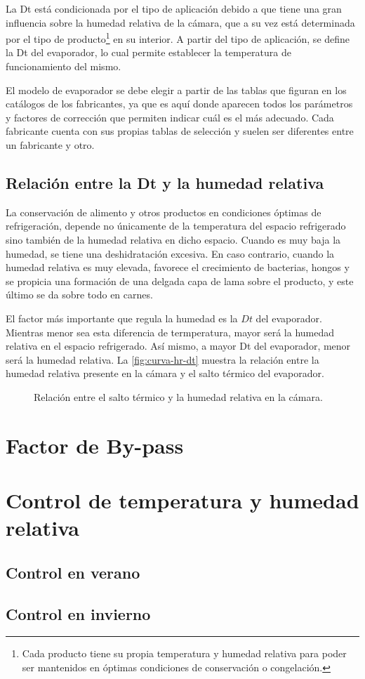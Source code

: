 		La Dt está condicionada por el tipo de aplicación debido a que tiene una gran influencia sobre la humedad relativa de la cámara, que a su vez está determinada por el tipo de producto\footnote{Cada producto tiene su propia temperatura y humedad relativa para poder ser mantenidos en óptimas condiciones de conservación o congelación.} en su interior. A partir del tipo de aplicación, se define la Dt del evaporador, lo cual permite establecer la temperatura de funcionamiento del mismo.
		
		El modelo de evaporador se debe elegir a partir de las tablas que figuran en los catálogos de los fabricantes, ya que es aquí donde aparecen todos los parámetros y factores de corrección que permiten indicar cuál es el más adecuado. Cada fabricante cuenta con sus propias tablas de selección y suelen ser diferentes entre un fabricante y otro.
		
		\subsection{Relación entre la Dt y la humedad relativa}
		
		La conservación de alimento y otros productos en condiciones óptimas de refrigeración, depende no únicamente de la temperatura del espacio refrigerado sino también de la humedad relativa en dicho espacio. Cuando es muy baja la humedad, se tiene una deshidratación excesiva. En caso contrario, cuando la humedad relativa es muy elevada, favorece el crecimiento de bacterias, hongos y se propicia una formación de una delgada capa de lama sobre el producto, y este último se da sobre todo en carnes.
		
		El factor más importante que regula la humedad es la $Dt$ del evaporador. Mientras menor sea esta diferencia de termperatura, mayor será la humedad relativa en el espacio refrigerado. Así mismo, a mayor Dt del evaporador, menor será la humedad relativa. La \autoref{fig:curva-hr-dt} muestra la relación entre la humedad relativa presente en la cámara y el salto térmico del evaporador.
		
		\begin{figure}[h]
			\centering
			\caption{Relación entre el salto térmico y la humedad relativa en la cámara.}
			\label{fig:curva-hr-dt}
		\end{figure}
	\section{Factor de By-pass}
	\section{Control de temperatura y humedad relativa}
		\subsection{Control en verano}
		\subsection{Control en invierno}
